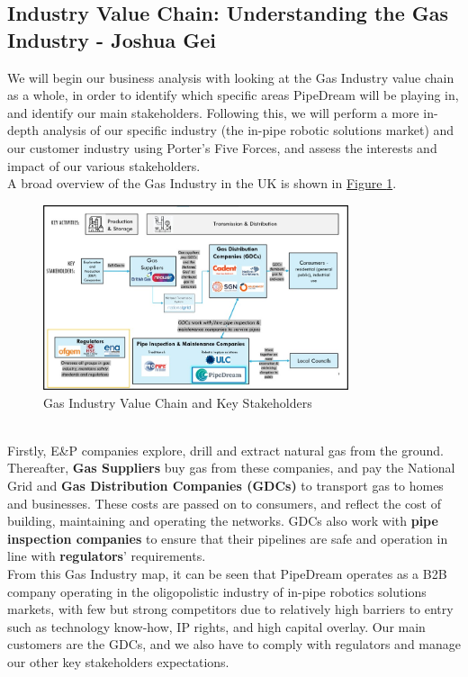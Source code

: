 \documentclass[11pt]{article}		%
\newcommand{\figref}[1]{\hyperref[#1]{Figure \ref*{#1}}}    %
\begin{document}
		\subsection[Industry Value Chain]{Industry Value Chain: Understanding the Gas Industry - Joshua Gei}
		We will begin our business analysis with looking at the Gas Industry value chain as a whole, in order to identify which specific areas PipeDream will be playing in, and identify our main stakeholders. Following this, we will perform a more in-depth analysis of our specific industry (the in-pipe robotic solutions market) and our customer industry using Porter’s Five Forces, and assess the interests and impact of our various stakeholders. 
        \\\hspace*{3ex}A broad overview of the Gas Industry in the UK is shown in \figref{Industry Value Chain}.
		\begin{figure}[h]
				\centering
				\includegraphics[width=0.8\textwidth]{industryvaluechain.jpg}
				\caption{Gas Industry Value Chain and Key Stakeholders}
				\label{Industry Value Chain}
			\end{figure}
		\\\hspace*{3ex}Firstly, E\&P companies explore, drill and extract natural gas from the ground. Thereafter, \textbf{Gas Suppliers} buy gas from these companies, and pay the National Grid and \textbf{Gas Distribution Companies (GDCs)} to transport gas to homes and businesses. These costs are passed on to consumers, and reflect the cost of building, maintaining and operating the networks. GDCs also work with \textbf{pipe inspection companies} to ensure that their pipelines are safe and operation in line with \textbf{regulators}’ requirements. 
        \\\hspace*{3ex}From this Gas Industry map, it can be seen that PipeDream operates as a B2B company operating in the oligopolistic industry of in-pipe robotics solutions markets, with few but strong competitors due to relatively high barriers to entry such as technology know-how, IP rights, and high capital overlay. Our main customers are the GDCs, and we also have to comply with regulators and manage our other key stakeholders expectations. 
\end{document}
